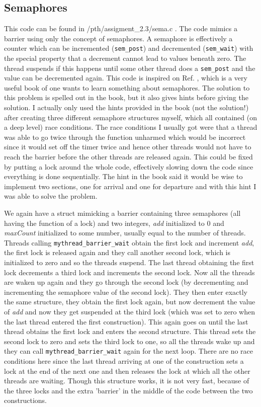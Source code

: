 \documentclass[11pt,a4paper,onecolumn]{article}
\begin{document}
\subsection{Semaphores}
This code can be found in /pth/assigment\_2.3/sema.c . The code mimics a barrier using only the concept of semaphores. A semaphore is effectively a counter which can be incremented (\texttt{sem\_post}) and decremented (\texttt{sem\_wait}) with the special property that a decrement cannot lead to values beneath zero. The thread suspends if this happens until some other thread does a \texttt{sem\_post} and the value can be decremented again. This code is inspired on Ref. \cite{sema}, which is a very useful book of one wants to learn something about semaphores. The solution to this problem is spelled out in the book, but it also gives hints before giving the solution. I actually only used the hints provided in the book (not the solution!) after creating three different semaphore structures myself, which all contained (on a deep level) race conditions. The race conditions I usually got were that a thread was able to go twice through the function unharmed which would be incorrect since it would set off the timer twice and hence other threads would not have to reach the barrier before the other threads are released again. This could be fixed by putting a lock around the whole code, effectively slowing down the code since everything is done sequentially. The hint in the book said it would be wise to implement two sections, one for arrival and one for departure and with this hint I was able to solve the problem.
 
We again have a struct mimicking a barrier containing three semaphores (all having the function of a lock) and two integers, \emph{add} initialized to 0 and \emph{maxCount} initialized to some number, usually equal to the number of threads. Threads calling \texttt{mythread\_barrier\_wait} obtain the first lock and increment \emph{add}, the first lock is released again and they call another second lock, which is initialized to zero and so the threads suspend. The last thread obtaining the first lock decrements a third lock and increments the second lock. Now all the threads are waken up again and they go through the second lock (by decrementing and incrementing the semaphore value of the second lock). They then enter exactly the same structure, they obtain the first lock again, but now decrement the value of \emph{add} and now they get suspended at the third lock (which was set to zero when the last thread entered the first construction). This again goes on until the last thread obtains the first lock and enters the second structure. This thread sets the second lock to zero and sets the third lock to one, so all the threads wake up and they can call \texttt{mythread\_barrier\_wait} again for the next loop. There are no race conditions here since the last thread arriving at one of the construction sets a lock at the end of the next one and then releases the lock at which all the other threads are waiting. Though this structure works, it is not very fast, because of the three locks and the extra 'barrier' in the middle of the code between the two constructions.
\end{document}

